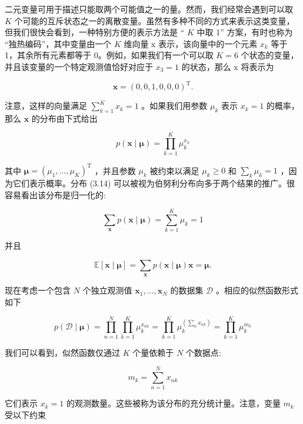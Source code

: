 \documentclass[10pt]{report}
\begin{document}
二元变量可用于描述只能取两个可能值之一的量。然而，我们经常会遇到可以取 \(K\) 个可能的互斥状态之一的离散变量。虽然有多种不同的方式来表示这类变量，但我们很快会看到，一种特别方便的表示方法是 “ \(K\) 中取 1” 方案，有时也称为 “独热编码”，其中变量由一个 \(K\) 维向量 \(\mathrm{x}\) 表示，该向量中的一个元素 \({x}_{k}\) 等于 1，其余所有元素都等于 0。例如，如果我们有一个可以取 \(K = 6\) 个状态的变量，并且该变量的一个特定观测值恰好对应于 \({x}_{3} = 1\) 的状态，那么 \(\mathrm{x}\) 将表示为

\[
\mathbf{x} = {\left( 0,0,1,0,0,0\right) }^{\mathrm{T}}. \tag{3.13}
\]

注意，这样的向量满足 \(\mathop{\sum }\limits_{{k = 1}}^{K}{x}_{k} = 1\) 。如果我们用参数 \({\mu }_{k}\) 表示 \({x}_{k} = 1\) 的概率，那么 \(\mathbf{x}\) 的分布由下式给出

\[
p\left( {\mathbf{x} \mid  \mathbf{\mu }}\right)  = \mathop{\prod }\limits_{{k = 1}}^{K}{\mu }_{k}^{{x}_{k}} \tag{3.14}
\]

其中 \(\mathbf{\mu } = {\left( {\mu }_{1},\ldots ,{\mu }_{K}\right) }^{\mathrm{T}}\) ，并且参数 \({\mu }_{k}\) 被约束以满足 \({\mu }_{k} \geq  0\) 和 \(\mathop{\sum }\limits_{k}{\mu }_{k} = 1\) ，因为它们表示概率。分布 (3.14) 可以被视为伯努利分布向多于两个结果的推广。很容易看出该分布是归一化的:

\[
\mathop{\sum }\limits_{\mathbf{x}}p\left( {\mathbf{x} \mid  \mathbf{\mu }}\right)  = \mathop{\sum }\limits_{{k = 1}}^{K}{\mu }_{k} = 1 \tag{3.15}
\]

并且

\[
\mathbb{E}\left\lbrack  {\mathbf{x} \mid  \mathbf{\mu }}\right\rbrack   = \mathop{\sum }\limits_{\mathbf{x}}p\left( {\mathbf{x} \mid  \mathbf{\mu }}\right) \mathbf{x} = \mathbf{\mu }. \tag{3.16}
\]

现在考虑一个包含 \(N\) 个独立观测值 \({\mathbf{x}}_{1},\ldots ,{\mathbf{x}}_{N}\) 的数据集 \(\mathcal{D}\) 。相应的似然函数形式如下

\[
p\left( {\mathcal{D} \mid  \mathbf{\mu }}\right)  = \mathop{\prod }\limits_{{n = 1}}^{N}\mathop{\prod }\limits_{{k = 1}}^{K}{\mu }_{k}^{{x}_{nk}} = \mathop{\prod }\limits_{{k = 1}}^{K}{\mu }_{k}^{\left( \mathop{\sum }\limits_{n}{x}_{nk}\right) } = \mathop{\prod }\limits_{{k = 1}}^{K}{\mu }_{k}^{{m}_{k}} \tag{3.17}
\]

我们可以看到，似然函数仅通过 \(K\) 个量依赖于 \(N\) 个数据点:

\[
{m}_{k} = \mathop{\sum }\limits_{{n = 1}}^{N}{x}_{nk} \tag{3.18}
\]

它们表示 \({x}_{k} = 1\) 的观测数量。这些被称为该分布的充分统计量。注意，变量 \({m}_{k}\) 受以下约束
\end{document}
